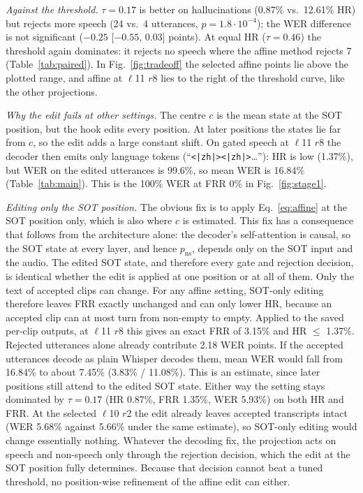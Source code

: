 \documentclass[conference,a4paper]{IEEEtran}
\newcommand{\pns}{p_{\mathrm{ns}}}
\begin{document}
\emph{Against the threshold.} $\tau = 0.17$ is better on hallucinations (0.87\% vs.\ 12.61\% HR) but rejects more speech (24 vs.\ 4 utterances, $p = 1.8\cdot10^{-4}$); the WER difference is not significant ($-0.25$ [$-0.55$, 0.03] points). At equal HR ($\tau = 0.46$) the threshold again dominates: it rejects no speech where the affine method rejects 7 (Table~\ref{tab:paired}). In Fig.~\ref{fig:tradeoff} the selected affine points lie above the plotted range, and affine at $\ell$11 $r$8 lies to the right of the threshold curve, like the other projections.

\emph{Why the edit fails at other settings.} The centre $c$ is the mean state at the SOT position, but the hook edits every position. At later positions the states lie far from $c$, so the edit adds a large constant shift. On gated speech at $\ell$11 $r$8 the decoder then emits only language tokens (``\texttt{<|zh|><|zh|>}\ldots''): HR is low (1.37\%), but WER on the edited utterances is 99.6\%, so mean WER is 16.84\% (Table~\ref{tab:main}). This is the 100\% WER at FRR 0\% in Fig.~\ref{fig:stage1}.

\emph{Editing only the SOT position.} The obvious fix is to apply Eq.~\eqref{eq:affine} at the SOT position only, which is also where $c$ is estimated. This fix has a consequence that follows from the architecture alone: the decoder's self-attention is causal, so the SOT state at every layer, and hence $\pns$, depends only on the SOT input and the audio. The edited SOT state, and therefore every gate and rejection decision, is identical whether the edit is applied at one position or at all of them. Only the text of accepted clips can change. For any affine setting, SOT-only editing therefore leaves FRR exactly unchanged and can only lower HR, because an accepted clip can at most turn from non-empty to empty. Applied to the saved per-clip outputs, at $\ell$11 $r$8 this gives an exact FRR of 3.15\% and HR $\le$ 1.37\%. Rejected utterances alone already contribute 2.18 WER points. If the accepted utterances decode as plain Whisper decodes them, mean WER would fall from 16.84\% to about 7.45\% (3.83\% / 11.08\%). This is an estimate, since later positions still attend to the edited SOT state. Either way the setting stays dominated by $\tau = 0.17$ (HR 0.87\%, FRR 1.35\%, WER 5.93\%) on both HR and FRR. At the selected $\ell$10 $r$2 the edit already leaves accepted transcripts intact (WER 5.68\% against 5.66\% under the same estimate), so SOT-only editing would change essentially nothing. Whatever the decoding fix, the projection acts on speech and non-speech only through the rejection decision, which the edit at the SOT position fully determines. Because that decision cannot beat a tuned threshold, no position-wise refinement of the affine edit can either.
\end{document}
